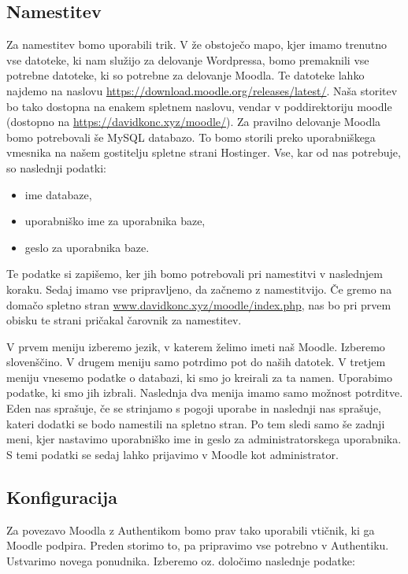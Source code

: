 \documentclass[a4paper,12pt,openright,oneside]{book}
\begin{document}
\subsection{Namestitev}
Za namestitev bomo uporabili trik. V že obstoječo mapo, kjer imamo trenutno vse datoteke, ki nam služijo za delovanje Wordpressa, bomo premaknili vse potrebne datoteke, ki so potrebne za delovanje Moodla. Te datoteke lahko najdemo na naslovu \href{https://download.moodle.org/releases/latest/}{https://download.moodle.org/releases/latest/}. Naša storitev bo tako dostopna na enakem spletnem naslovu, vendar v poddirektoriju moodle (dostopno na \href{https://davidkonc.xyz/moodle/}{https://davidkonc.xyz/moodle/}).
\newline
Za pravilno delovanje Moodla bomo potrebovali še MySQL databazo. To bomo storili preko uporabniškega vmesnika na našem gostitelju spletne strani Hostinger. Vse, kar od nas potrebuje, so naslednji podatki:
\begin{itemize}
    \item ime databaze,
    \item uporabniško ime za uporabnika baze,
    \item geslo za uporabnika baze.
\end{itemize}
Te podatke si zapišemo, ker jih bomo potrebovali pri namestitvi v naslednjem koraku. 
\newline
Sedaj imamo vse pripravljeno, da začnemo z namestitvijo. Če gremo na domačo spletno stran \href{www.davidkonc.xyz/moodle/index.php}{www.davidkonc.xyz/moodle/index.php}, nas bo pri prvem obisku te strani pričakal čarovnik za namestitev. 

V prvem meniju izberemo jezik, v katerem želimo imeti naš Moodle. Izberemo slovenščino. V drugem meniju samo potrdimo pot do naših datotek. V tretjem meniju vnesemo podatke o databazi, ki smo jo kreirali za ta namen. Uporabimo podatke, ki smo jih izbrali. Naslednja dva menija imamo samo možnost potrditve. Eden nas sprašuje, če se strinjamo s pogoji uporabe in naslednji nas sprašuje, kateri dodatki se bodo namestili na spletno stran. Po tem sledi samo še zadnji meni, kjer nastavimo uporabniško ime in geslo za administratorskega uporabnika. S temi podatki se sedaj lahko prijavimo v Moodle kot administrator. 
\subsection{Konfiguracija}

Za povezavo Moodla z Authentikom bomo prav tako uporabili vtičnik, ki ga Moodle podpira. Preden storimo to, pa pripravimo vse potrebno v Authentiku. Ustvarimo novega ponudnika. Izberemo oz. določimo naslednje podatke:
\end{document}
